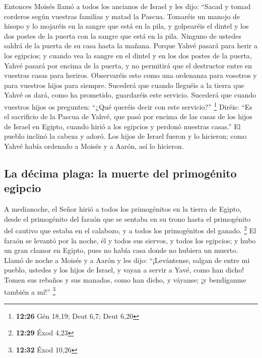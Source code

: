 \begin{paracol}{2}
 Entonces Moisés llamó a todos los ancianos de Israel y
les dijo: ``Sacad y tomad corderos según vuestras familias y matad la
Pascua.  Tomaréis un manojo de hisopo y lo mojaréis en la
sangre que está en la pila, y golpearéis el dintel y los dos postes de
la puerta con la sangre que está en la pila. Ninguno de ustedes saldrá
de la puerta de su casa hasta la mañana.  Porque Yahvé
pasará para herir a los egipcios; y cuando vea la sangre en el dintel y
en los dos postes de la puerta, Yahvé pasará por encima de la puerta, y
no permitirá que el destructor entre en vuestras casas para heriros.
 Observaréis esto como una ordenanza para vosotros y para
vuestros hijos para siempre.  Sucederá que cuando
lleguéis a la tierra que Yahvé os dará, como ha prometido, guardaréis
este servicio.  Sucederá que cuando vuestros hijos os
pregunten: ``¿Qué queréis decir con este servicio?'' \footnote{\textbf{12:26}
  Gén 18,19; Deut 6,7; Deut 6,20}  Diréis: ``Es el
sacrificio de la Pascua de Yahvé, que pasó por encima de las casas de
los hijos de Israel en Egipto, cuando hirió a los egipcios y perdonó
nuestras casas.'' El pueblo inclinó la cabeza y adoró. 
Los hijos de Israel fueron y lo hicieron; como Yahvé había ordenado a
Moisés y a Aarón, así lo hicieron.

\hypertarget{la-duxe9cima-plaga-la-muerte-del-primoguxe9nito-egipcio}{%
\subsection{La décima plaga: la muerte del primogénito
egipcio}\label{la-duxe9cima-plaga-la-muerte-del-primoguxe9nito-egipcio}}

 A medianoche, el Señor hirió a todos los primogénitos en
la tierra de Egipto, desde el primogénito del faraón que se sentaba en
su trono hasta el primogénito del cautivo que estaba en el calabozo, y a
todos los primogénitos del ganado. \footnote{\textbf{12:29} Éxod 4,23}
 El faraón se levantó por la noche, él y todos sus
siervos, y todos los egipcios; y hubo un gran clamor en Egipto, pues no
había casa donde no hubiera un muerto.  Llamó de noche a
Moisés y a Aarón y les dijo: ``¡Levántense, salgan de entre mi pueblo,
ustedes y los hijos de Israel, y vayan a servir a Yavé, como han dicho!
 Tomen sus rebaños y sus manadas, como han dicho, y
váyanse; ¡y bendíganme también a mí!'' \footnote{\textbf{12:32} Éxod
  10,26}


\end{paracol}
